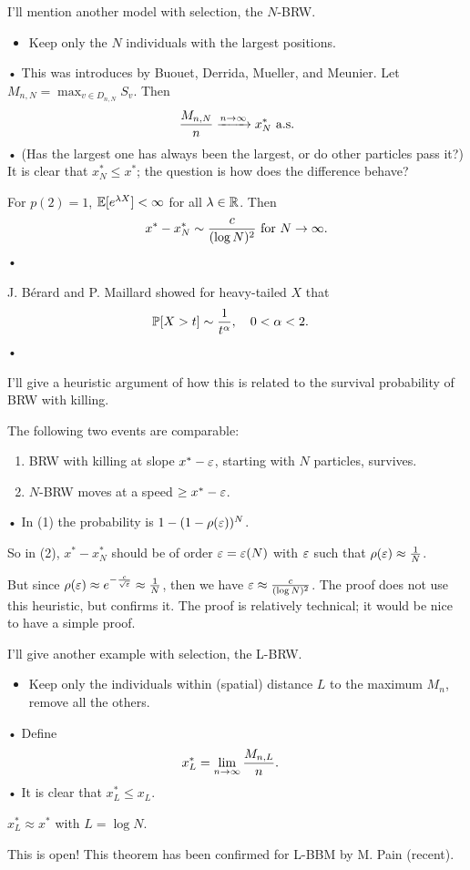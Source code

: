 I'll mention another model with selection, the $N$-BRW.
\begin{itemize}
\item
Keep only the $N$ individuals with the largest positions.
\end{itemize}•
This was introduces by Buouet, Derrida, Mueller, and Meunier. Let $M_{n,N}=\max_{v\in D_{n,N}}S_v$. Then
\begin{align*}
\frac{M_{n,N}}{n}\xrightarrow{n\to \infty} x_N^*\text{ a.s.}
\end{align*}•
(Has the largest one has always been the largest, or do other particles pass it?)
It is clear that $x_N^*\le x^*$; the question is how does the difference behave?
\begin{thm}
For $p(2)=1$, $\mathbb{E}[e^{\lambda X}]<\infty$ for all $\lambda \in \mathbb{R}$. Then
\begin{align*}
x^* - x_N^* \sim \frac{c}{(\log N)^2}\text{ for }N\to \infty.
\end{align*}•
\end{thm}
J. B\'erard and P. Maillard showed for heavy-tailed $X$ that
\begin{align*}
\mathbb{P}[X>t] &\sim \frac{1}{t^\alpha}, \quad 0<\alpha<2.
\end{align*}•

I'll give a heuristic argument of how this is related to the survival probability of BRW with killing.

The following two events are comparable:
\begin{enumerate}
\item
BRW with killing at slope $x^*-\varepsilon$, starting with $N$ particles, survives.
\item 
$N$-BRW moves at a speed $\ge x^*-\varepsilon$.
\end{enumerate}•
In  
(1) the probability is $1-(1-\rho(\varepsilon))^N$. 

So in 
(2), $x^*-x_N^*$ should be of order $\varepsilon=\varepsilon(N)$ with $\varepsilon$ such that $\rho(\varepsilon)\approx \frac{1}{N}$.

But since $\rho(\varepsilon)\approx e^{-\frac{c}{\sqrt {\varepsilon}}}\approx \frac{1}{N}$, then we have $\varepsilon\approx \frac{c}{(\log N)^2}$. The proof does not use this heuristic, but confirms it.
The proof is relatively technical; it would be nice to have a simple proof.

I'll give another example with selection, the L-BRW.
\begin{itemize}
\item
Keep only the individuals within (spatial) distance $L$ to the maximum $M_n$, remove all the others.
\end{itemize}•
Define
\begin{align*}
x_L^* &= \lim_{n\to \infty}\frac{M_{n,L}}{n}.
\end{align*}•
It is clear that $x_L^*\le x_L$. %
\begin{conj}[BDMM]
$x_L^*\approx x^*$ %
with $L=\log N$.
\end{conj} 
This is open!
This theorem has been confirmed for L-BBM by M. Pain (recent).


